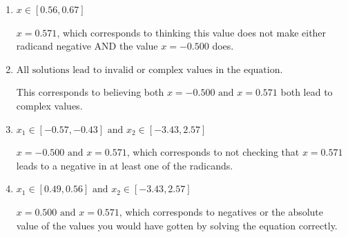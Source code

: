 \documentclass{extbook}[14pt]
\begin{document}
\begin{enumerate}
{\begin{enumerate}[label=\Alph*.]
* This is the correct option.
\item \( x \in [0.56,0.67] \)

$x = 0.571$, which corresponds to thinking this value does not make either radicand negative AND the value $x = -0.500$ does.
\item \( \text{All solutions lead to invalid or complex values in the equation.} \)

This corresponds to believing both $x = -0.500 \text{ and } x = 0.571$ both lead to complex values.
\item \( x_1 \in [-0.57, -0.43] \text{ and } x_2 \in [-3.43,2.57] \)

$x = -0.500 \text{ and } x = 0.571$, which corresponds to not checking that $x = 0.571$ leads to a negative in at least one of the radicands.
\item \( x_1 \in [0.49, 0.56] \text{ and } x_2 \in [-3.43,2.57] \)

$x = 0.500 \text{ and } x = 0.571$, which corresponds to negatives or the absolute value of the values you would have gotten by solving the equation correctly.
\end{enumerate}

}
\end{enumerate}
\end{document}
